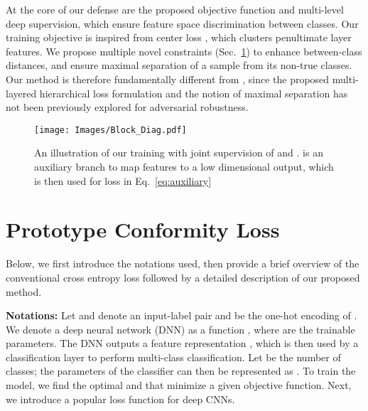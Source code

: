 \documentclass[10pt,twocolumn,letterpaper]{article}
\begin{document}
At the core of our defense are the proposed objective function and multi-level deep supervision, which ensure feature space discrimination between classes. Our training objective is inspired from center loss \cite{wen2016discriminative}, which clusters penultimate layer features. We propose multiple novel constraints (Sec.~\ref{sec:background}) to enhance between-class distances, and ensure maximal separation of a sample from its non-true classes. Our method is therefore fundamentally different from \cite{wen2016discriminative}, since the proposed multi-layered hierarchical loss formulation and the notion of maximal separation has not been previously explored for adversarial robustness. 























\begin{figure}
    \centering
{\texttt{[image: Images/Block\_Diag.pdf]} }
   \vspace{-1em}
    \caption{\small{An illustration of our training with joint supervision of   and  .  is an auxiliary branch to map features to a low dimensional output, which is then used for loss in Eq.~\ref{eq:auxiliary}}}
    \label{fig:block_diag}\vspace{-0.5em}    
\end{figure}

\section{Prototype Conformity Loss}
\label{sec:background}

Below, we first introduce the notations used, then provide a brief overview of the conventional cross entropy loss followed by a detailed description of our proposed method.

\noindent \textbf{Notations:} Let  and  denote an input-label pair and  be the one-hot encoding of . We denote a deep neural network (DNN) as a function ,  where  are the trainable parameters. The DNN outputs a feature representation , which is then used by a classification layer to perform multi-class classification. Let  be the number of classes; the parameters of the classifier can then be represented as . To train the model, we find the optimal  and  that minimize a given objective function. Next, we introduce a popular loss function for deep CNNs.
\end{document}
